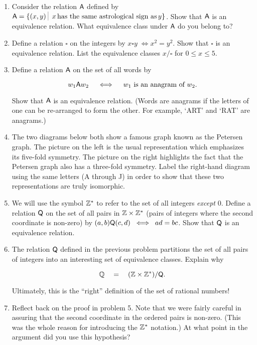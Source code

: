 \begin{enumerate}
\item Consider the relation $\mbox{\textsf A}$ defined by 
$ \relA = \{ (x,y) \suchthat \; x \, \mbox{has the same astrological sign as} \, y \}$.  Show that $\mbox{\textsf A}$ is an equivalence relation.  What equivalence class
under $\mbox{\textsf A}$ do you belong to?
\item Define a relation $\square$ on the integers by $x \square y \; \iff x^2 = y^2$.  Show that $\square$ is an equivalence relation.  List the equivalence
classes $x/\square$ for $0 \leq x \leq 5$.
\item Define a relation $\mbox{\textsf A}$ on the set of all words by

\[ w_1 \mbox{\textsf A} w_2 \quad \iff \quad w_1 \mbox{ is an anagram of } w_2. \]

\noindent Show that $\mbox{\textsf A}$ is an equivalence relation.  (Words are anagrams
if the letters of one can be re-arranged to form the other.  For example, `ART' and `RAT' are anagrams.)
\item The two diagrams below both show a famous graph known as the 
Petersen graph.  The picture on the 
left is the usual representation which emphasizes its five-fold symmetry.  The picture on the right
highlights the fact that the Petersen graph also has a three-fold symmetry.  Label the right-hand diagram
using the same letters (A through J) in order to show that these two representations are truly isomorphic.

\vspace{.2in}

\rule{0pt}{0pt} \hspace{-.75in} 

\vspace{.2in}

\item We will use the symbol ${\mathbb Z}^{\ast}$ to refer to the set of
all integers \emph{except} $0$.  
Define a relation $\mbox{\textsf Q}$ on the set of all pairs in ${\mathbb Z} \times {\mathbb Z}^{\ast}$ (pairs of integers where the second coordinate is non-zero) by
$(a,b) \mbox{\textsf Q} (c,d) \; \iff \; ad=bc$.  Show that $\mbox{\textsf Q}$ is an 
equivalence relation.

\item The relation $\mbox{\textsf Q}$ defined in the previous problem partitions
the set of all pairs of integers into an interesting set of equivalence
classes.  Explain why 

\[ {\mathbb Q} \quad = \quad ({\mathbb Z} \times {\mathbb Z}^{\ast}) / \mbox{\textsf Q}. \]

\noindent Ultimately, this is the ``right'' definition of the set 
of rational numbers!

\item Reflect back on the proof in problem 5.  Note that we were fairly
careful in assuring that the second coordinate in the ordered pairs is
non-zero. (This was the whole reason for introducing the 
${\mathbb Z}^{\ast}$ notation.)  At what point in the argument did you
use this hypothesis?

\end{enumerate} 

